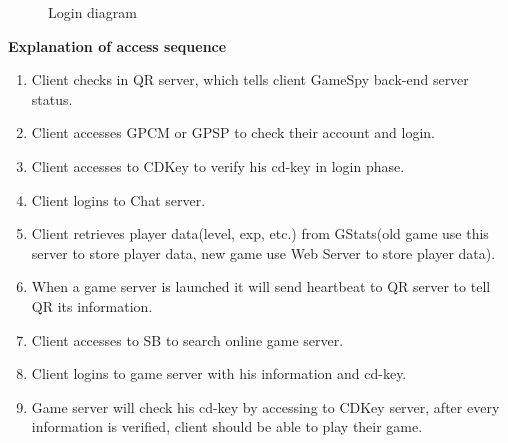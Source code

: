 \documentclass[oneside,titlepage,a4paper]{Definition/retrospy} %
\begin{document}
\begin{figure}[H]
	\centering
	\caption{Login diagram}
	\label{Login diagram}
\end{figure}

\begin{flushleft}
\textbf{Explanation of access sequence}
\end{flushleft}

\begin{enumerate}
	\item Client checks in QR server, which tells client GameSpy back-end server status.
	\item Client accesses GPCM or GPSP to check their account and login.
	\item Client accesses to CDKey to verify his cd-key in login phase.
	\item Client logins to Chat server.
	\item Client retrieves player data(level, exp, etc.) from GStats(old game use this server to store player data, new game use Web Server to store player data).
	\item When a game server is launched it will send heartbeat to QR server to tell QR its information.
	\item Client accesses to SB to search online game server.
	\item Client logins to game server with his information and cd-key.
	\item Game server will check his cd-key by accessing to CDKey server, after every information is verified, client should be able to play their game.
\end{enumerate}
\end{document}
